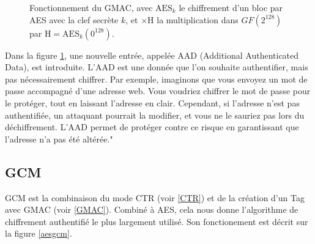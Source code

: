 \documentclass[a4paper, 12pt]{article}
\begin{document}
\begin{figure}[h]
\caption{Fonctionnement du GMAC, avec $\text{AES}_k$ le chiffrement d'un bloc par AES avec la clef secrète $k$, et $\times \text{H}$ la multiplication dans $GF\left(2^{128}\right)$ par $\text{H} = \text{AES}_k\left({0}^{128}\right)$.}
\label{gmac}
\end{figure}

Dans la figure \ref{gmac}, une nouvelle entrée, appelée AAD (Additional Authenticated Data), est introduite. L'AAD est une donnée que l'on souhaite authentifier, mais pas nécessairement chiffrer. Par exemple, imaginons que vous envoyez un mot de passe accompagné d'une adresse web. Vous voudriez chiffrer le mot de passe pour le protéger, tout en laissant l'adresse en clair. Cependant, si l'adresse n'est pas authentifiée, un attaquant pourrait la modifier, et vous ne le sauriez pas lors du déchiffrement. L'AAD permet de protéger contre ce risque en garantissant que l'adresse n'a pas été altérée."

\subsection{GCM}

GCM est la combinaison du mode CTR (voir \ref{CTR}) et de la création d'un Tag avec GMAC (voir \ref{GMAC}). Combiné à AES, cela nous donne l'algorithme de chiffrement authentifié le plus largement utilisé. Son fonctionement est décrit sur la figure \ref{aesgcm}.
\end{document}
